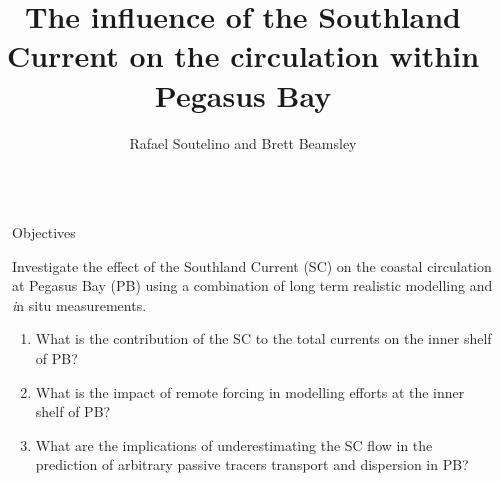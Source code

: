 \documentclass[final]{beamer}
\title{The influence of the Southland Current on the circulation within Pegasus Bay} %
\author{Rafael Soutelino and Brett Beamsley} %
\institute{MetOcean Solutions} %
\newlength{\sepwid}
\newlength{\onecolwid}
\begin{document}

\setlength{\belowcaptionskip}{2ex} %
\setlength\belowdisplayshortskip{2ex} %

\begin{frame}[t] %

\begin{columns}[t] %

\begin{column}{\sepwid}\end{column} %

\begin{column}{\onecolwid} %


    \begin{alertblock}{Objectives}

    Investigate the effect of the Southland Current (SC) on the coastal circulation at Pegasus Bay (PB) using a combination of long term realistic modelling and {\textit in situ} measurements.

    \begin{enumerate}
    \item What is the contribution of the SC to the total currents on the inner shelf of PB?
    \item What is the impact of remote forcing in modelling efforts at the inner shelf of PB?
    \item What are the implications of underestimating the SC flow in the prediction of arbitrary passive tracers transport and dispersion in PB?
    \end{enumerate}

    \end{alertblock}



\end{column}
\end{columns}
\end{frame}
\end{document}
